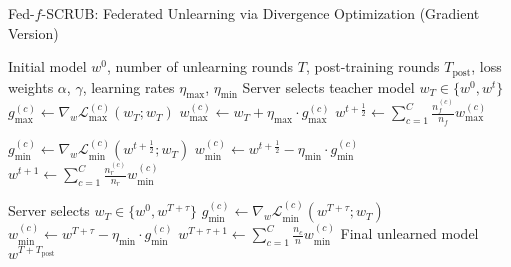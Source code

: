 \documentclass{article}
\begin{document}
\begin{algorithm}[t]
\caption{Fed-$f$-SCRUB: Federated Unlearning via Divergence Optimization (Gradient Version)}
\label{alg:fed-f-scrub-gradient}
\begin{algorithmic}[1]
\Require Initial model $w^0$, number of unlearning rounds $T$, post-training rounds $T_{\mathrm{post}}$, loss weights $\alpha$, $\gamma$, learning rates $\eta_{\mathrm{max}}$, $\eta_{\mathrm{min}}$
    \State Server selects teacher model $w_T \in \{w^0, w^t\}$
        \State $g_{\mathrm{max}}^{(c)} \gets \nabla_w \mathcal{L}_{\mathrm{max}}^{(c)}(w_T; w_T)$
        \State $w_{\mathrm{max}}^{(c)} \gets w_T + \eta_{\mathrm{max}} \cdot g_{\mathrm{max}}^{(c)}$
    \EndFor
    \State $w^{t+\frac{1}{2}} \gets \sum_{c=1}^C \frac{n_f^{(c)}}{n_f} w_{\mathrm{max}}^{(c)}$

        \State $g_{\mathrm{min}}^{(c)} \gets \nabla_w \mathcal{L}_{\mathrm{min}}^{(c)}(w^{t+\frac{1}{2}}; w_T)$
        \State $w_{\mathrm{min}}^{(c)} \gets w^{t+\frac{1}{2}} - \eta_{\mathrm{min}} \cdot g_{\mathrm{min}}^{(c)}$
    \EndFor
    \State $w^{t+1} \gets \sum_{c=1}^C \frac{n_r^{(c)}}{n_r} w_{\mathrm{min}}^{(c)}$
\EndFor

    \State Server selects $w_T \in \{w^0, w^{T+\tau}\}$
        \State $g_{\mathrm{min}}^{(c)} \gets \nabla_w \mathcal{L}_{\mathrm{min}}^{(c)}(w^{T+\tau}; w_T)$
        \State $w_{\mathrm{min}}^{(c)} \gets w^{T+\tau} - \eta_{\mathrm{min}} \cdot g_{\mathrm{min}}^{(c)}$
    \EndFor
    \State $w^{T+\tau+1} \gets \sum_{c=1}^C \frac{n_c}{n} w_{\mathrm{min}}^{(c)}$
\EndFor
\State \Return Final unlearned model $w^{T + T_{\mathrm{post}}}$
\end{algorithmic}
\end{algorithm}





\clearpage
\newpage


\end{document}
